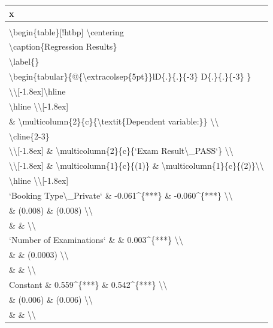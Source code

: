 \documentclass[11pt,a4paper,]{article}
\begin{document}
\begin{tabular}{l}
\hline
x\\
\hline
\\
\hline
\textbackslash{}begin\{table\}[!htbp] \textbackslash{}centering\\
\hline
\textbackslash{}caption\{Regression Results\}\\
\hline
\textbackslash{}label\{\}\\
\hline
\textbackslash{}begin\{tabular\}\{@\{\textbackslash{}extracolsep\{5pt\}\}lD\{.\}\{.\}\{-3\} D\{.\}\{.\}\{-3\} \}\\
\hline
\textbackslash{}\textbackslash{}[-1.8ex]\textbackslash{}hline\\
\hline
\textbackslash{}hline \textbackslash{}\textbackslash{}[-1.8ex]\\
\hline
\& \textbackslash{}multicolumn\{2\}\{c\}\{\textbackslash{}textit\{Dependent variable:\}\} \textbackslash{}\textbackslash{}\\
\hline
\textbackslash{}cline\{2-3\}\\
\hline
\textbackslash{}\textbackslash{}[-1.8ex] \& \textbackslash{}multicolumn\{2\}\{c\}\{`Exam Result\textbackslash{}\_PASS`\} \textbackslash{}\textbackslash{}\\
\hline
\textbackslash{}\textbackslash{}[-1.8ex] \& \textbackslash{}multicolumn\{1\}\{c\}\{(1)\} \& \textbackslash{}multicolumn\{1\}\{c\}\{(2)\}\textbackslash{}\textbackslash{}\\
\hline
\textbackslash{}hline \textbackslash{}\textbackslash{}[-1.8ex]\\
\hline
`Booking Type\textbackslash{}\_Private` \& -0.061\textasciicircum{}\{***\} \& -0.060\textasciicircum{}\{***\} \textbackslash{}\textbackslash{}\\
\hline
\& (0.008) \& (0.008) \textbackslash{}\textbackslash{}\\
\hline
\& \& \textbackslash{}\textbackslash{}\\
\hline
`Number of Examinations` \&  \& 0.003\textasciicircum{}\{***\} \textbackslash{}\textbackslash{}\\
\hline
\&  \& (0.0003) \textbackslash{}\textbackslash{}\\
\hline
\& \& \textbackslash{}\textbackslash{}\\
\hline
Constant \& 0.559\textasciicircum{}\{***\} \& 0.542\textasciicircum{}\{***\} \textbackslash{}\textbackslash{}\\
\hline
\& (0.006) \& (0.006) \textbackslash{}\textbackslash{}\\
\hline
\& \& \textbackslash{}\textbackslash{}\\

\end{tabular}
\end{document}
